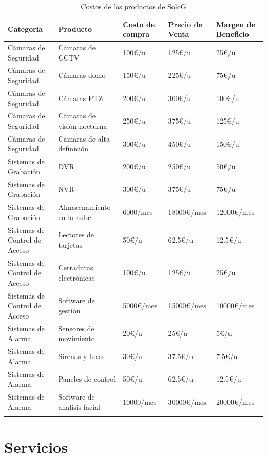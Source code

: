 \documentclass{report}
\begin{document}
            \begin{longtable}{|p{4cm}|p{4cm}|p{2cm}|p{2cm}|p{2cm}|}
              \hline
              \textbf{Categoria} & \textbf{Producto} & \textbf{Costo de compra} & \textbf{Precio de Venta} & \textbf{Margen de Beneficio}\\
              \hline
              \hline
              Cámaras de Seguridad & Cámaras de CCTV & 100€/u & 125€/u & 25€/u\\
              \hline
              Cámaras de Seguridad & Cámaras domo & 150€/u & 225€/u & 75€/u\\
              \hline
              Cámaras de Seguridad & Cámaras PTZ & 200€/u & 300€/u & 100€/u\\
              \hline
              Cámaras de Seguridad & Cámaras de visión nocturna & 250€/u & 375€/u & 125€/u\\
              \hline
              Cámaras de Seguridad & Cámaras de alta definición & 300€/u & 450€/u & 150€/u\\
              \hline
              Sistemas de Grabación & DVR & 200€/u & 250€/u & 50€/u\\
              \hline
              Sistemas de Grabación & NVR & 300€/u & 375€/u & 75€/u\\
              \hline
              Sistemas de Grabación & Almacenamiento en la nube & 6000/mes & 18000€/mes & 12000€/mes\\
              \hline
              Sistemas de Control de Acceso & Lectores de tarjetas & 50€/u & 62.5€/u & 12.5€/u\\
              \hline
              Sistemas de Control de Acceso & Cerraduras electrónicas & 100€/u & 125€/u & 25€/u\\
              \hline
              Sistemas de Control de Acceso & Software de gestión & 5000€/mes & 15000€/mes & 10000€/mes\\
              \hline
              Sistemas de Alarma & Sensores de movimiento & 20€/u & 25€/u & 5€/u\\
              \hline
              Sistemas de Alarma & Sirenas y luces & 30€/u & 37.5€/u & 7.5€/u\\
              \hline
              Sistemas de Alarma & Paneles de control & 50€/u & 62.5€/u & 12.5€/u\\
              \hline
              Sistemas de Alarma & Software de analisis facial & 10000/mes & 30000€/mes & 20000€/mes\\
              \hline
              \caption{Costos de los productos de SoloG}
            \end{longtable}
        \clearpage\section{Servicios}
\end{document}
